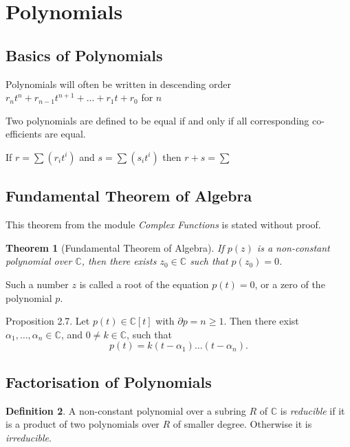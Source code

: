 \documentclass[12pt]{article}
\newtheorem{theorem}{Theorem}
\theoremstyle{definition}
\newtheorem{definition}[theorem]{Definition}
\begin{document}
\section{Polynomials}
\subsection{Basics of Polynomials}
Polynomials will often be written in descending order $r_n t^n + r_{n-1} t^{n+1} + ... + r_1 t + r_0$ for $n$

Two polynomials are defined to be equal if and only if all corresponding co-efficients are equal.

If $r = \sum (r_i t^i)$ and $s = \sum (s_i t^i)$ then $r+s = \sum$



\subsection{Fundamental Theorem of Algebra} \label{thm:fundamental-algebra}
This theorem from the module \textit{Complex Functions} is stated without proof. 

\begin{theorem}[Fundamental Theorem of Algebra]
    If $p(z)$ is a non-constant polynomial over $\mathbb{C}$, then there exists $z_0 \in \mathbb{C}$ such that $p\left(z_0\right)=0$.
\end{theorem}

Such a number $z$ is called a root of the equation $p(t)=0$, or a zero of the polynomial $p$. 

Proposition 2.7. Let $p(t) \in \mathbb{C}[t]$ with $\partial p=n \geq 1$. Then there exist $\alpha_1, \ldots, \alpha_n \in \mathbb{C}$, and $0 \neq k \in \mathbb{C}$, such that
$$
p(t)=k\left(t-\alpha_1\right) \ldots\left(t-\alpha_n\right).
$$

\subsection{Factorisation of Polynomials}
\begin{definition}
     A non-constant polynomial over a subring $R$ of $\mathbb{C}$ is \textit{reducible} if it is a product of two polynomials over $R$ of smaller degree. Otherwise it is \textit{irreducible}.
\end{definition}
\end{document}
